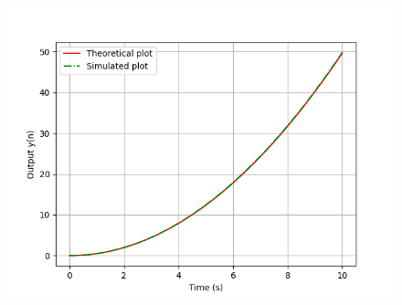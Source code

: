 \documentclass[journal]{IEEEtran}
\begin{document}
\begin{figure}[h]
   \centering
   \includegraphics[width=\columnwidth]{figs/fig.png}
\end{figure}
\end{document}
